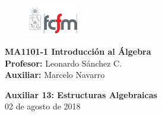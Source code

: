 \documentclass[letterpaper,10pt]{article}
\theoremstyle{plain}
\begin{document}
\newpage
\pagestyle{fancy}
\fancyhf{}

\begin{figure} %
    \vspace{-5mm}
    \includegraphics[width=0.2\textwidth]{img/fcfm2.png}
\end{figure}


\noindent
\textbf{MA1101-1 Introducción al Álgebra}\\
\textbf{Profesor: }Leonardo Sánchez C.\\
\textbf{Auxiliar: }Marcelo Navarro

\begin{center}
{\bf \Large Auxiliar 13: Estructuras Algebraicas}\\
{02 de agosto de 2018}
\end{center}
\end{document}
